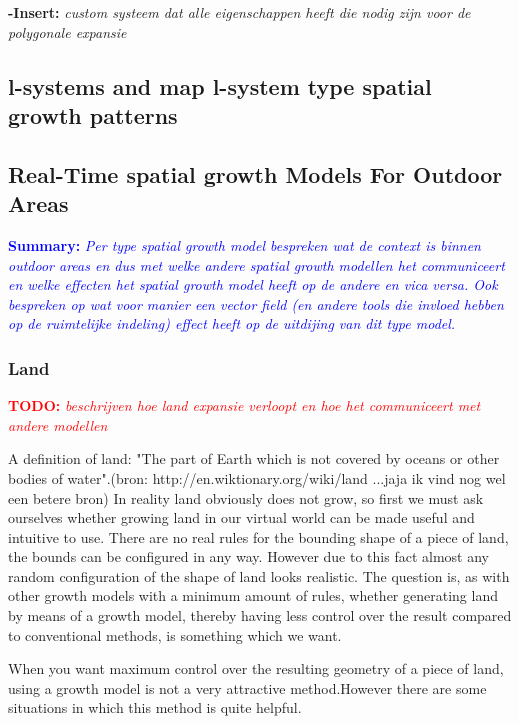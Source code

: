 \documentclass{article}
\newcommand{\todo}[1]{\textcolor{red}{\textbf{\newline TODO: }\it{#1} \newline}}
\newcommand{\inhoud}[1]{\textcolor{blue}{\textbf{\newline Summary: }\it{#1}}}
\newcommand{\voegtoe}[1]{\textcolor{MyDarkGreen}{\textbf{-Insert: }\it{#1}}}
\begin{document}
\voegtoe{custom systeem dat alle eigenschappen heeft die nodig zijn voor de polygonale expansie}



\cite{compgeom}
\cite{vertexsystems}

\subsection{l-systems and map l-system type spatial growth patterns}

\cite{lcreport}


\subsection{Real-Time spatial growth Models For Outdoor Areas}
\inhoud{Per type spatial growth model bespreken wat de context is binnen outdoor areas en dus met 
welke andere spatial growth modellen het communiceert en welke effecten het spatial growth model heeft 
op de andere en vica versa. Ook bespreken op wat voor manier een vector field (en andere tools 
die invloed hebben op de ruimtelijke indeling)  effect heeft op de uitdijing van dit type model.   
}

\subsubsection{Land} 
\todo{beschrijven hoe land expansie verloopt en hoe het communiceert met andere modellen}

A definition of land: "The part of Earth which is not covered by oceans or other bodies of water".(bron: http://en.wiktionary.org/wiki/land ...jaja ik vind nog wel een betere bron)
In reality land obviously does not grow, so first we must ask ourselves whether growing land in our virtual world can be made useful and intuitive to use. There are no real rules for the bounding shape of a piece of land, the bounds can be configured in any way. However due to this fact almost any random configuration of the shape of land looks realistic. The question is, as with other growth models with a minimum amount of rules, whether generating land by means of a growth model, thereby having less control over the result compared to conventional methods, is something which we want. 

When you want maximum control over the resulting geometry of a piece of land, using a growth model is not a very attractive method.However there are some situations in which this method is quite helpful.
\end{document}
